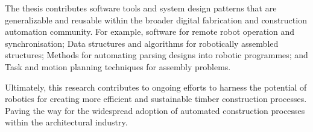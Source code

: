 \begin{adjustwidth}{20mm}{20mm}
The thesis contributes software tools and system design patterns that are generalizable and reusable within the broader digital fabrication and construction automation community. For example, software for remote robot operation and synchronisation; Data structures and algorithms for robotically assembled structures; Methods for automating parsing designs into robotic programmes; and Task and motion planning techniques for assembly problems.

Ultimately, this research contributes to ongoing efforts to harness the potential of robotics for creating more efficient and sustainable timber construction processes. Paving the way for the widespread adoption of automated construction processes within the architectural industry.
    
\end{adjustwidth}